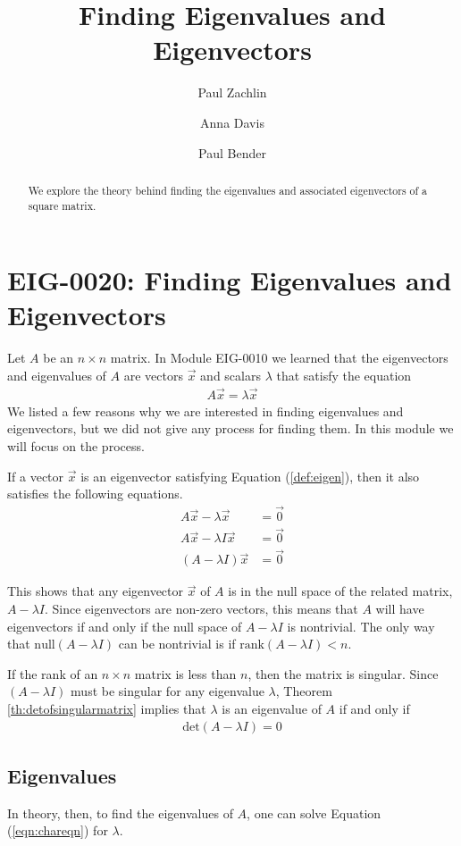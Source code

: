 \documentclass{ximera}
\author{Paul Zachlin \and Anna Davis \and Paul Bender} \title{Finding Eigenvalues and Eigenvectors} \license{CC-BY 4.0}
\begin{document}
\begin{abstract}
We explore the theory behind finding the eigenvalues and associated eigenvectors of a square matrix.  
\end{abstract}
\maketitle
\section*{EIG-0020: Finding Eigenvalues and Eigenvectors}
Let $A$ be an $n \times n$ matrix.  In Module EIG-0010 we learned that the eigenvectors and eigenvalues of $A$ are vectors $\vec{x}$ and scalars $\lambda$ that satisfy the equation 
\begin{align}\label{def:eigen} A \vec{x} = \lambda \vec{x}\end{align}
We listed a few reasons why we are interested in finding eigenvalues and eigenvectors, but we did not give any process for finding them.  In this module we will focus on the process.

If a vector $\vec{x}$ is an eigenvector satisfying Equation (\ref{def:eigen}), then it also satisfies the following equations.
\begin{align*}
A\vec{x}-\lambda \vec{x} &= \vec{0} \\
A\vec{x}-\lambda I\vec{x} &= \vec{0} \\
(A-\lambda I)\vec{x} &= \vec{0}
\end{align*}

This shows that any eigenvector $\vec{x}$ of $A$ is in the null space of the related matrix, $A-\lambda I$.  Since eigenvectors are non-zero vectors, this means that $A$ will have eigenvectors if and only if the null space of $A-\lambda I$ is nontrivial.  The only way that $\mbox{null}(A-\lambda I)$ can be nontrivial is if $\mbox{rank}(A-\lambda I)<n$.

If the rank of an $n \times n$ matrix is less than $n$, then the matrix is singular.  Since $(A-\lambda I)$ must be singular for any eigenvalue $\lambda$, Theorem \ref{th:detofsingularmatrix} implies that $\lambda$ is an eigenvalue of $A$ if and only if \begin{align}\label{eqn:chareqn}\mbox{det}(A-\lambda I) = 0\end{align}

\subsection{Eigenvalues}
In theory, then, to find the eigenvalues of $A$, one can solve Equation (\ref{eqn:chareqn}) for $\lambda$.  
\end{document}
